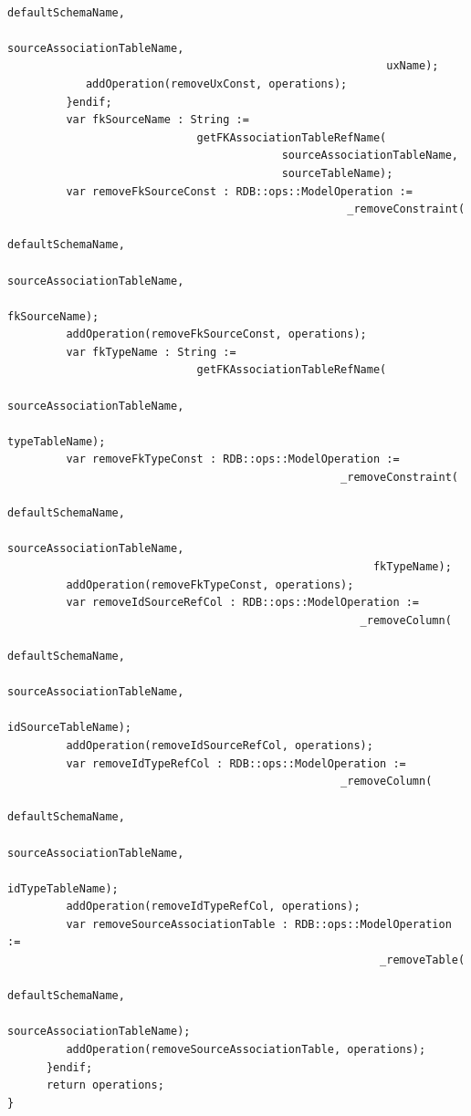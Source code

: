 \documentclass[11pt,twoside,a4paper]{book}
\begin{document}
\begin{verbatim}
                                                          defaultSchemaName,
                                                          sourceAssociationTableName,
                                                          uxName);
            addOperation(removeUxConst, operations);
         }endif;
         var fkSourceName : String := 
                             getFKAssociationTableRefName(
                                          sourceAssociationTableName,
                                          sourceTableName);
         var removeFkSourceConst : RDB::ops::ModelOperation :=
                                                    _removeConstraint( 
                                                         defaultSchemaName,
                                                         sourceAssociationTableName,
                                                         fkSourceName);
         addOperation(removeFkSourceConst, operations);
         var fkTypeName : String := 
                             getFKAssociationTableRefName(
                                                        sourceAssociationTableName,
                                                        typeTableName);
         var removeFkTypeConst : RDB::ops::ModelOperation := 
                                                   _removeConstraint(
                                                        defaultSchemaName,
                                                        sourceAssociationTableName,
                                                        fkTypeName);
         addOperation(removeFkTypeConst, operations);
         var removeIdSourceRefCol : RDB::ops::ModelOperation := 
                                                      _removeColumn(
                                                           defaultSchemaName,
                                                           sourceAssociationTableName,
                                                           idSourceTableName);
         addOperation(removeIdSourceRefCol, operations);
         var removeIdTypeRefCol : RDB::ops::ModelOperation := 
                                                   _removeColumn(
                                                      defaultSchemaName,
                                                      sourceAssociationTableName,
                                                      idTypeTableName);
         addOperation(removeIdTypeRefCol, operations);
         var removeSourceAssociationTable : RDB::ops::ModelOperation :=
                                                         _removeTable(
                                                           defaultSchemaName,
                                                           sourceAssociationTableName);
         addOperation(removeSourceAssociationTable, operations);																								
      }endif;	
      return operations;	
}
\end{verbatim}
\end{document}
